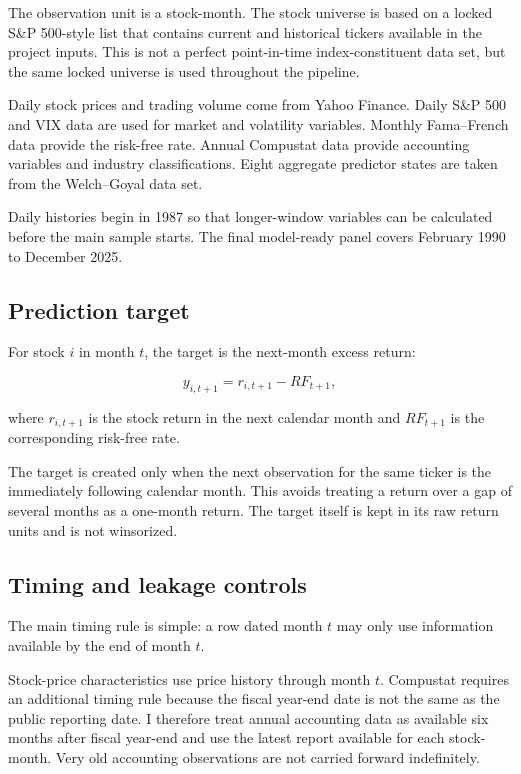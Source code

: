 \documentclass[11pt,a4paper]{article}
\begin{document}
The observation unit is a stock-month. The stock universe is based on a locked
S\&P 500-style list that contains current and historical tickers available in
the project inputs. This is not a perfect point-in-time index-constituent data
set, but the same locked universe is used throughout the pipeline.

Daily stock prices and trading volume come from Yahoo Finance. Daily S\&P 500
and VIX data are used for market and volatility variables. Monthly
Fama--French data provide the risk-free rate. Annual Compustat data provide
accounting variables and industry classifications. Eight aggregate predictor
states are taken from the Welch--Goyal data set.

Daily histories begin in 1987 so that longer-window variables can be calculated
before the main sample starts. The final model-ready panel covers February 1990
to December 2025.

\subsection{Prediction target}

For stock \(i\) in month \(t\), the target is the next-month excess return:

\begin{equation}
 y_{i,t+1}=r_{i,t+1}-RF_{t+1},
 \label{eq:target}
\end{equation}

where \(r_{i,t+1}\) is the stock return in the next calendar month and
\(RF_{t+1}\) is the corresponding risk-free rate.

The target is created only when the next observation for the same ticker is the
immediately following calendar month. This avoids treating a return over a gap
of several months as a one-month return. The target itself is kept in its raw
return units and is not winsorized.

\subsection{Timing and leakage controls}

The main timing rule is simple: a row dated month \(t\) may only use information
available by the end of month \(t\).

Stock-price characteristics use price history through month \(t\). Compustat
requires an additional timing rule because the fiscal year-end date is not the
same as the public reporting date. I therefore treat annual accounting data as
available six months after fiscal year-end and use the latest report available
for each stock-month. Very old accounting observations are not carried forward
indefinitely.
\end{document}
